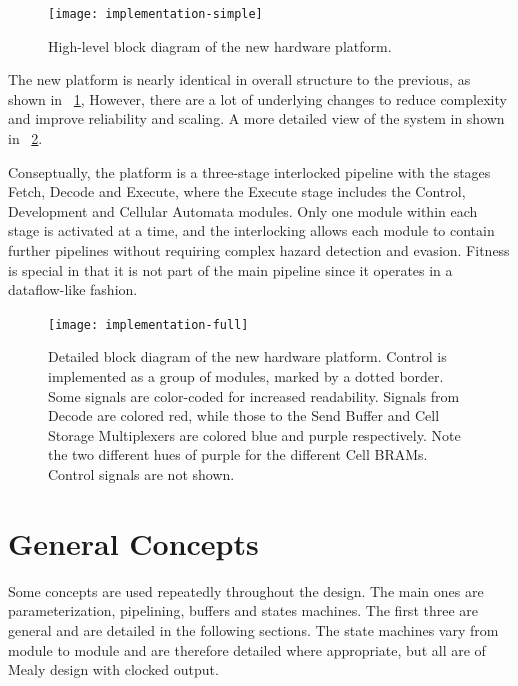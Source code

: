 \begin{figure}[!ht]
    \centering
    \texttt{[image: implementation-simple]}
    \caption[High-level system diagram]{
        High-level block diagram of the new hardware platform.
    }
    \label{fig:implementation-simple}
\end{figure}


The new platform is nearly identical in overall structure to the previous, as shown in \figurename~\ref{fig:implementation-simple},
However, there are a lot of underlying changes to reduce complexity and improve reliability and scaling.
A more detailed view of the system in shown in \figurename~\ref{fig:implementation-full}.

Conseptually, the platform is a three-stage interlocked pipeline with the stages Fetch, Decode and Execute, where the Execute stage includes the Control, Development and Cellular Automata modules.
Only one module within each stage is activated at a time, and the interlocking allows each module to contain further pipelines without requiring complex hazard detection and evasion.
Fitness is special in that it is not part of the main pipeline since it operates in a dataflow-like fashion.

\begin{figure}
    \centering
    \texttt{[image: implementation-full]}
    \caption[Detailed system diagram]{
        Detailed block diagram of the new hardware platform.
        Control is implemented as a group of modules, marked by a dotted border.
        Some signals are color-coded for increased readability.
        Signals from Decode are colored red, while those to the Send Buffer and Cell Storage Multiplexers are colored blue and purple respectively.
        Note the two different hues of purple for the different Cell BRAMs.
        Control signals are not shown.
    }
    \label{fig:implementation-full}
\end{figure}


\section{General Concepts}

Some concepts are used repeatedly throughout the design.
The main ones are parameterization, pipelining, buffers and states machines.
The first three are general and are detailed in the following sections.
The state machines vary from module to module and are therefore detailed where appropriate, but all are of Mealy design with clocked output.

